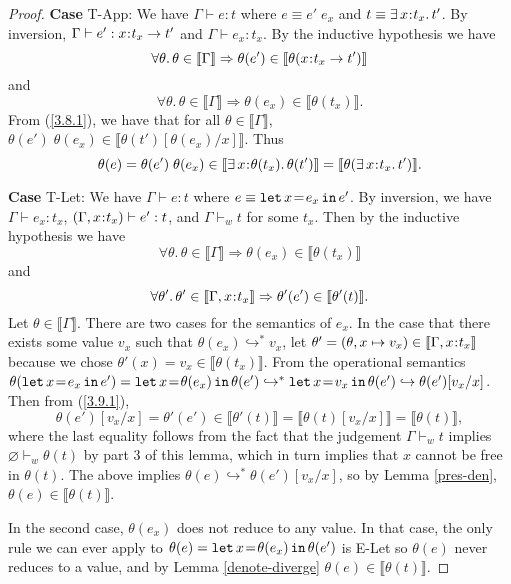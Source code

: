 \documentclass[11pt]{article}
\newcommand{\bind}{\hspace{0.05em}{:}\hspace{0.05em}} %
\newcommand{\lb}{\llbracket}         %
\newcommand{\rb}{\rrbracket}         %
\newcommand{\step}{\hookrightarrow}
\newcommand{\many}{\hookrightarrow^*}
\newcommand{\existype}[3]{\exists\, #1\bind #2.\, #3}
\newcommand{\functype}[3]{#1\bind #2 \rightarrow #3}
\newcommand{\foralltheta}{\forall\theta.\,\theta\in\lb\Gamma\rb}
\newcommand{\letin}[3]{{\tt let}\,#1\hspace{0.1em}{=}\hspace{0.1em}#2\,{\tt in}\,#3}
\begin{document}
\begin{proof}
{\bf Case} {\sc T-App}: We have $\Gamma \vdash e : t$ where $e \equiv e'\; e_x$ and $t \equiv \existype{x}{t_x}{t'}$. By inversion,
$\Gamma \vdash e' : \functype{x}{t_x}{t'}$ and $\Gamma \vdash e_x : t_x$. 
By the inductive hypothesis we have
\begin{equation}\label{3.8.1}
\forall \theta.\, \theta\in\lb\Gamma\rb \Rightarrow 
\theta(e') \in \lb\theta(\functype{x}{t_x}{t'})\rb\end{equation}
and
\begin{equation}\label{3.8.2}
\forall \theta.\, \theta \in \lb\Gamma\rb \Rightarrow
\theta(e_x) \in \lb\theta(t_x)\rb.
\end{equation}
From (\ref{3.8.1}), we have that for all $\theta \in \lb\Gamma\rb$, $\theta(e')\; \theta(e_x) \in \lb\theta(t')[\theta(e_x)/x]\rb$. Thus
\begin{equation}
\theta(e) = \theta(e')\; \theta(e_x) \in \lb \existype{x}{\theta(t_x)}{\theta(t')}\rb = \lb\theta(\existype{x}{t_x}{t'})\rb
.\end{equation}

{\bf Case} {\sc T-Let}: We have $\Gamma \vdash e : t$ where
$e \equiv \letin{x}{e_x}{e'}$.
By inversion, we have $\Gamma \vdash e_x : t_x$,\; $(\Gamma,x\bind t_x) \vdash e' : t$, and $\Gamma \vdash_w t$
for some $t_x$. Then by the inductive hypothesis we have
\[
\foralltheta \Rightarrow \theta(e_x) \in \lb\theta(t_x)\rb
\] and 
\begin{equation}\label{3.9.1}
\forall\theta'.\, \theta' \in \lb\Gamma,x\bind t_x\rb \Rightarrow \theta'(e') \in \lb\theta'(t)\rb.\end{equation}
Let $\theta \in \lb\Gamma\rb$. There are two cases for the semantics of $e_x$. In the case that there exists some value $v_x$ such that $\theta(e_x) \many v_x$, let $\theta' = (\theta, x\mapsto v_x)\in \lb\Gamma,x\bind t_x\rb$ because we chose $\theta'(x) = v_x \in \lb\theta(t_x)\rb$. 
From the operational semantics $\theta(\letin{x}{e_x}{e'}) = \letin{x}{\theta(e_x)}{\theta(e')} \many \letin{x}{v_x}{\theta(e')} \step \theta(e')[v_x/x]$. 
Then from (\ref{3.9.1}),
\[
\theta(e')[v_x/x] = \theta'(e') \in \lb\theta'(t)\rb = \lb\theta(t)[v_x/x]\rb = \lb\theta(t)\rb,
\]
where the last equality follows from the fact that the judgement $\Gamma \vdash_w t$ implies $\varnothing \vdash_w \theta(t)$ by part 3 of this lemma, which in turn implies that $x$ cannot be free in $\theta(t)$.
The above implies
$\theta(e) \many \theta(e')[v_x/x]$, so by Lemma \ref{pres-den}, $\theta(e) \in \lb\theta(t)\rb$.

In the second case, $\theta(e_x)$ does not reduce to any value. In that case, the only rule we can ever apply to $\theta(e) = \letin{x}{\theta(e_x)}{\theta(e')}$ is {\sc E-Let} so $\theta(e)$ never reduces to a value, and by Lemma \ref{denote-diverge} $\theta(e) \in \lb\theta(t)\rb$.


\end{proof}
\end{document}
